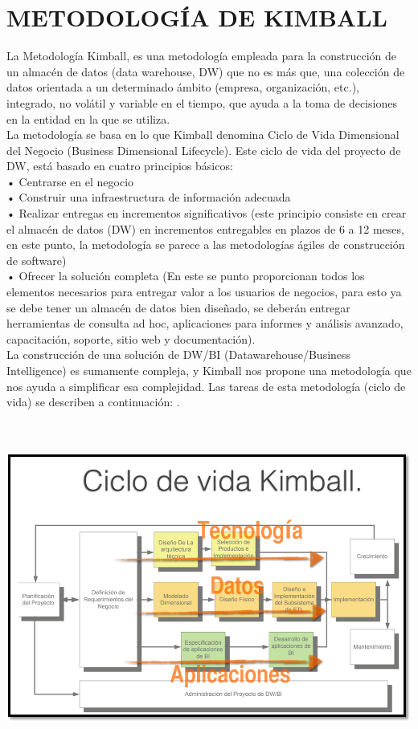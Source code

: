 \section{METODOLOGÍA DE KIMBALL}
La Metodología Kimball, es una metodología empleada para la construcción de un almacén de datos (data warehouse, DW) que no es más que, una colección de datos orientada a un determinado ámbito (empresa, organización, etc.), integrado, no volátil y variable en el tiempo, que ayuda a la toma de decisiones en la entidad en la que se utiliza.\\
La metodología se basa en lo que Kimball denomina Ciclo de Vida Dimensional del Negocio (Business Dimensional Lifecycle). Este ciclo de vida del proyecto de DW, está basado en cuatro principios básicos:\\
•	Centrarse en el negocio\\
•	Construir una infraestructura de información adecuada\\
•	Realizar entregas en incrementos significativos (este principio consiste en crear el almacén de datos (DW) en incrementos entregables en plazos de 6 a 12 meses, en este punto, la metodología se parece a las metodologías ágiles de construcción de software)\\
•	Ofrecer la solución completa (En este se punto proporcionan todos los elementos necesarios para entregar valor a los usuarios de negocios, para esto ya se debe tener un almacén de datos bien diseñado, se deberán entregar herramientas de consulta ad hoc, aplicaciones para informes y análisis avanzado, capacitación, soporte, sitio web y documentación).\\
La construcción de una solución de DW/BI (Datawarehouse/Business Intelligence) es sumamente compleja, y Kimball nos propone una metodología que nos ayuda a simplificar esa complejidad. Las tareas de esta metodología (ciclo de vida) se describen a continuación:
.\\\\\

\begin{center}
\includegraphics[width=15cm]{./Imagenes/image011}
\end{center}

